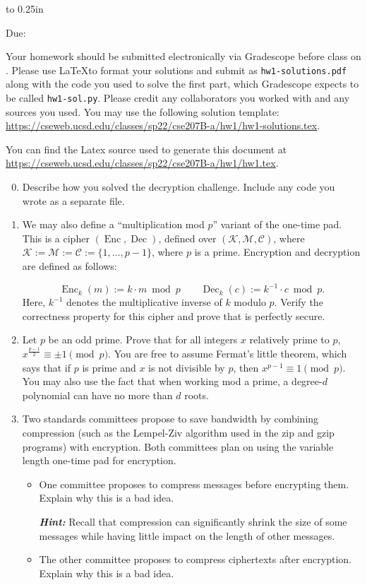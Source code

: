 \documentclass[letterpaper,12pt]{article}
\newcommand{\htitle}
{
    \vbox to 0.25in{}
    \noindent\parbox{\textwidth}
    {
        \course\hfill \assigndate\newline
        \coursename\hfill
        Due: \duedate \vspace*{-.5ex}\newline
        \mbox{}\hrulefill\mbox{}
    }
    \vspace{8pt}
    \begin{center}{\Large\bf{\settitle}}\end{center}
}
\newcommand{\handout}
{
    \thispagestyle{empty}
    \markboth{}{}
    \pagestyle{plain}
    \htitle
}
\newcommand{\problemsetheader}
{
Your homework should be submitted electronically via Gradescope before class on \duedate.  Please use \LaTeX to format your solutions and submit as \texttt{hw1-solutions.pdf} along with the code you used to solve the first part, which Gradescope expects to be called \texttt{hw1-sol.py}.  Please credit any collaborators you worked with and any sources you used.  You may use the following solution template: \\
\url{https://cseweb.ucsd.edu/classes/sp22/cse207B-a/hw1/hw1-solutions.tex}.

\medskip

You can find the Latex source used to generate this document at \\ \url{https://cseweb.ucsd.edu/classes/sp22/cse207B-a/hw1/hw1.tex}.

\hrulefill

\bigskip
}
\begin{document}
\handout
\setlength{\parindent}{0pt}
\problemsetheader

\begin{enumerate}
\setcounter{enumi}{-1}
\item Describe how you solved the decryption challenge.  Include any code you wrote as a separate file.

\item 

We may also define a ``multiplication mod $p$'' variant of the one-time pad.  This is a cipher $(\operatorname{Enc}, \operatorname{Dec})$, defined over $(\mathcal{K},\mathcal{M}, \mathcal{C})$, where $\mathcal{K} := \mathcal{M} := \mathcal{C} := \{1, \dots, p-1\}$, where $p$ is a prime.  Encryption and decryption are defined as follows:

\[
\operatorname{Enc}_k(m) := k \cdot m \bmod p \qquad \operatorname{Dec}_k(c) := k^{-1} \cdot c \bmod p.
\]
Here, $k^{-1}$ denotes the multiplicative inverse of $k$ modulo $p$.  Verify the correctness property for this cipher and prove that is perfectly secure.

\item

Let $p$ be an odd prime. Prove that for all integers $x$ relatively prime to $p$, $x^{\frac{p-1}{2}} \equiv \pm 1 \pmod{p}$. 
You are free to assume Fermat's little theorem, which says that if $p$ is prime and $x$ is not divisible by $p$, then $x^{p-1} \equiv 1 \pmod{p}$.
You may also use the fact that when working mod a prime, a degree-$d$ polynomial can have no more than $d$ roots.

\item

Two standards committees propose to save bandwidth by combining compression (such as the Lempel-Ziv algorithm used in the zip and gzip programs) with encryption.  Both committees plan on using the variable length one-time pad for encryption.

\begin{itemize}
\item One committee proposes to compress messages before encrypting them.  Explain why this is a bad idea.

\textit{\textbf{Hint:}} Recall that compression can significantly shrink the size of some messages while having little impact on the length of other messages.

\item The other committee proposes to compress ciphertexts after encryption.  Explain why this is a bad idea.

\end{itemize}

\end{enumerate}
\vfill
\end{document}
